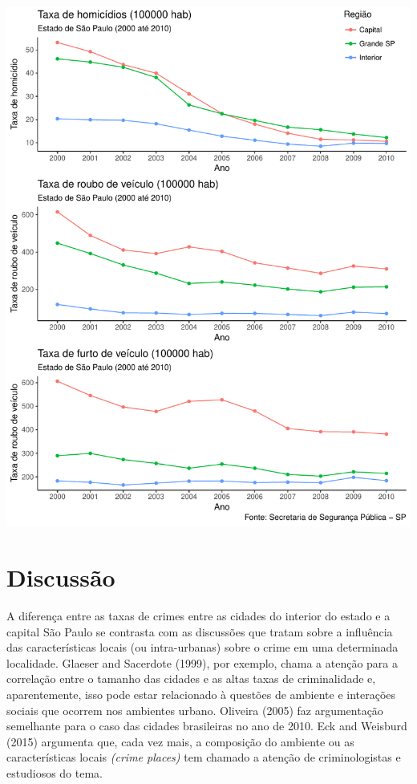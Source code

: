 \documentclass[]{article}
\begin{document}
\includegraphics{Análise_1_files/figure-latex/Gráficos-1.pdf}

\newpage

\section{Discussão}\label{discussao}

A diferença entre as taxas de crimes entre as cidades do interior do
estado e a capital São Paulo se contrasta com as discussões que tratam
sobre a influência das características locais (ou intra-urbanas) sobre o
crime em uma determinada localidade. Glaeser and Sacerdote (1999), por
exemplo, chama a atenção para a correlação entre o tamanho das cidades e
as altas taxas de criminalidade e, aparentemente, isso pode estar
relacionado à questões de ambiente e interações sociais que ocorrem nos
ambientes urbano. Oliveira (2005) faz argumentação semelhante para o
caso das cidades brasileiras no ano de 2010. Eck and Weisburd (2015)
argumenta que, cada vez mais, a composição do ambiente ou as
características locais \emph{(crime places)} tem chamado a atenção de
criminologistas e estudiosos do tema.
\end{document}
